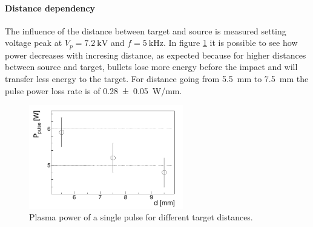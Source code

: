 \paragraph{Distance dependency}
The influence of the distance between target and source is measured setting voltage peak at $V_{p} = \SI{7.2}{\kilo\volt}$ and $f = \SI{5}{\kilo\hertz}$. In figure \ref{fig:Pd} it is possible to see how power decreases with incresing distance, as expected because for higher distances between source and target, bullets lose more energy before the impact and will transfer less energy to the target. For distance going from \SI{5.5}{\milli\meter} to \SI{7.5}{\milli\meter} the pulse power loss rate is of \SI{0.28(5)}{\watt/\milli\meter}.
\begin{figure}
 \centering
 \includegraphics[width=0.6\textwidth]{Images/Temperature/Ppulse_d_2.png}
 \caption{Plasma power of a single pulse for different target distances.}
 \label{fig:Pd}
\end{figure}
